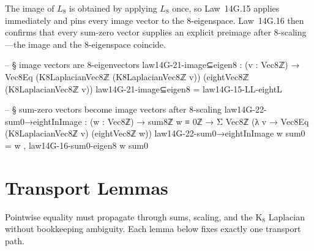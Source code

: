 \documentclass[11pt,a4paper]{book}
\begin{document}
The image of $L_8$ is obtained by applying $L_8$ once, so Law~14G.15 applies immediately and pins every image vector to the $8$-eigenspace. Law~14G.16 then confirms that every sum-zero vector supplies an explicit preimage after $8$-scaling---the image and the $8$-eigenspace coincide.

\begin{code}
-- § image vectors are 8-eigenvectors
law14G-21-image⊆eigen8 : (v : Vec8ℤ) → Vec8Eq (K8LaplacianVec8ℤ (K8LaplacianVec8ℤ v)) (eightVec8ℤ (K8LaplacianVec8ℤ v))
law14G-21-image⊆eigen8 = law14G-15-LL-eightL

-- § sum-zero vectors become image vectors after 8-scaling
law14G-22-sum0→eightInImage : (w : Vec8ℤ) → sum8ℤ w ≡ 0ℤ → Σ Vec8ℤ (λ v → Vec8Eq (K8LaplacianVec8ℤ v) (eightVec8ℤ w))
law14G-22-sum0→eightInImage w sum0 = w , law14G-16-sum0-eigen8 w sum0
\end{code}

\section{Transport Lemmas}

Pointwise equality must propagate through sums, scaling, and the K$_8$ Laplacian without bookkeeping ambiguity. Each lemma below fixes exactly one transport path.
\end{document}
